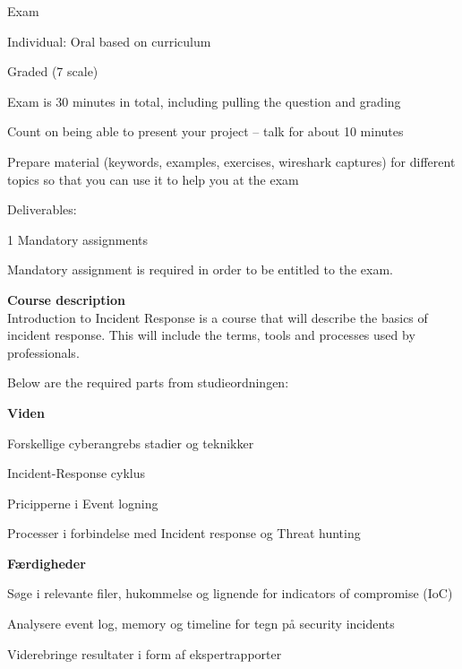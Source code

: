 \documentclass[Screen16to9,17pt]{foils}
\begin{document}
\begin{list2}
\item Exam
\item Individual: Oral based on curriculum
\item Graded (7 scale)
\item Exam is 30 minutes in total, including pulling the question and grading
\item Count on being able to present your project -- talk for about 10 minutes
\item Prepare material (keywords, examples, exercises, wireshark captures) for different topics so that you can use it to help you at the exam

\vskip 5mm
\item Deliverables:
\item 1 Mandatory assignments
\item Mandatory assignment is required in order to be entitled to the exam.
\end{list2}



{\bf Course description}\\
Introduction to Incident Response is a course that will describe the basics of incident response. This will include the terms, tools and processes used by professionals.

Below are the required parts from studieordningen:

{\bf Viden}
\begin{list2}
\item Forskellige cyberangrebs stadier og teknikker
\item Incident-Response cyklus
\item Pricipperne i Event logning
\item Processer i forbindelse med Incident response og Threat hunting
\end{list2}


{\bf Færdigheder}

\begin{list2}
\item Søge i relevante filer, hukommelse og lignende for indicators of compromise (IoC)
\item Analysere event log, memory og timeline for tegn på security incidents
\item Viderebringe resultater i form af ekspertrapporter
\end{list2}
\end{document}
